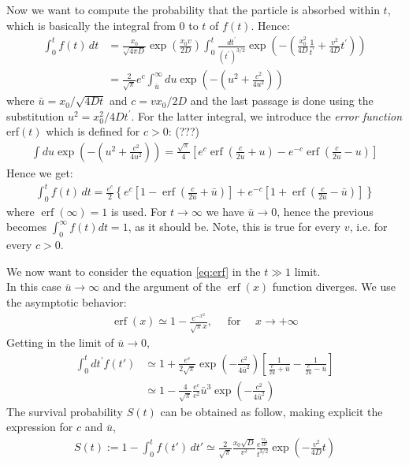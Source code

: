 \documentclass[4apaper,11pt,fleqn]{article}
\theoremstyle{remark}
\theoremstyle{definition}
\begin{document}
Now we want to compute the probability that the particle is absorbed within $t$, which is basically the integral from 0 to $t$ of $f(t)$. Hence:
\begin{align*}
  \int_0^t f(t) \, dt &= \frac{x_{0}}{\sqrt{4 \pi D}} \exp \left(\frac{x_{0} v}{2 D}\right) \int_{0}^{t} \frac{d t^{\prime}}{\left(t^{\prime}\right)^{3 / 2}} \exp \left(-\left(\frac{x_{0}^{2}}{4 D} \frac{1}{t^{\prime}}+\frac{v^{2}}{4 D} t^{\prime}\right)\right) \\
                      &= \frac{2}{\sqrt{\pi}} e^{c} \int_{\bar{u}}^{\infty} d u \exp \left(-\left(u^{2}+\frac{c^{2}}{4 u^{2}}\right)\right)
\end{align*}
where $\bar{u} = x_0/\sqrt{4Dt}$ and $c= v x_0/2D$ and the last passage is done using the substitution $u^2=x_0^2/4Dt^'$.
For the latter integral, we introduce the \emph{error function} erf$(t)$ which is defined for $c>0$: (???)
\begin{align*}
  \int d u \exp \left(-\left(u^{2}+\frac{c^{2}}{4 u^{2}}\right)\right)=\frac{\sqrt{\pi}}{4}\left[e^{c} \operatorname{erf}\left(\frac{c}{2 u}+u\right)-e^{-c} \operatorname{erf}\left(\frac{c}{2 u}-u\right)\right]
\end{align*}
Hence we get:
\begin{align}
  \label{eq:erf}
  \int_0^t f(t) \, dt =  \frac{e^{c}}{2}\left\{e^{c}\left[1-\operatorname{erf}\left(\frac{c}{2 \bar{u}}+\bar{u}\right)\right]+e^{-c}\left[1+\operatorname{erf}\left(\frac{c}{2 \bar{u}}-\bar{u}\right)\right]\right\}
\end{align}
where $\operatorname{erf}(\infty)=1$ is used.
For $t \rightarrow \infty$ we have $\bar{u} \rightarrow 0$, hence the previous becomes $\int_0^\infty f(t) dt = 1$, as it should be. Note, this is true for every $v$, i.e. for every $c>0$.

We now want to consider the equation \eqref{eq:erf} in the $t \gg 1$ limit.\\
In this case $\bar{u}\rightarrow \infty$ and the argument of the $\operatorname{erf}(x)$ function diverges. We use the asymptotic behavior:
\begin{align*}
  \operatorname{erf}(x) \simeq 1-\frac{e^{-x^{2}}}{\sqrt{\pi} x}, \quad \text { for } \quad x \rightarrow+\infty
\end{align*}
Getting in the limit of $\bar{u} \rightarrow 0$,
\begin{align*}
 \int_{0}^{t} d t^{\prime} f(t') & \simeq 1+\frac{e^{c}}{2 \sqrt{\pi}} \exp \left(-\frac{c^{2}}{4 \bar{u}^{2}}\right)\left[\frac{1}{\frac{c}{2 \bar{u}}+\bar{u}}-\frac{1}{\frac{c}{2 \bar{u}}-\bar{u}}\right] \\ & \simeq 1-\frac{4}{\sqrt{\pi}} \frac{e^{c}}{c^{2}} \bar{u}^{3} \exp \left(-\frac{c^{2}}{4 \bar{u}^{2}}\right)
\end{align*}
The survival probability $S(t)$ can be obtained as follow, making explicit the expression for $c$ and $\bar{u}$,
\begin{align*}
  S(t) := 1- \int_0^t f(t') \, dt' \simeq \frac{2}{\sqrt{\pi}} \frac{x_{0} \sqrt{D}}{v^{2}} \frac{e^{\frac{v x_{0}}{2 D}}}{t^{3 / 2}} \exp \left(-\frac{v^{2}}{4 D} t\right)
\end{align*}
\end{document}
